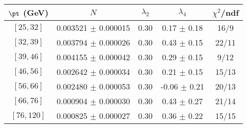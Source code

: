 \begin{tabular}{c||c|c|c|c}
$\pt$ (GeV) & $N$ & $\lambda_{2}$ & $\lambda_4$  & $\chi^2$/ndf  \\
\hline
$[25, 32]$ & 0.003521 $\pm$ 0.000015 & 0.30 & 0.17 $\pm$ 0.18 & 16/9\\
$[32, 39]$ & 0.003794 $\pm$ 0.000026 & 0.30 & 0.43 $\pm$ 0.15 & 22/11\\
$[39, 46]$ & 0.004155 $\pm$ 0.000042 & 0.30 & 0.29 $\pm$ 0.15 & 9/12\\
$[46, 56]$ & 0.002642 $\pm$ 0.000034 & 0.30 & 0.21 $\pm$ 0.15 & 15/13\\
$[56, 66]$ & 0.002480 $\pm$ 0.000053 & 0.30 & -0.06 $\pm$ 0.21 & 20/13\\
$[66, 76]$ & 0.000904 $\pm$ 0.000030 & 0.30 & 0.43 $\pm$ 0.27 & 21/14\\
$[76, 120]$ & 0.000825 $\pm$ 0.000027 & 0.30 & 0.36 $\pm$ 0.22 & 15/15\\
\end{tabular}
